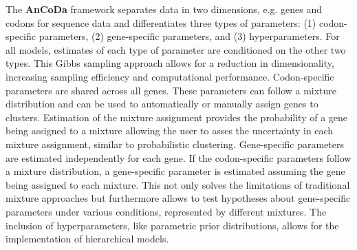 \documentclass{bioinfo}
\newcommand{\package}{\textbf{AnCoDa }} %
\begin{document}
The \package framework separates data in two dimensions, e.g. genes and codons for sequence data and differentiates three types of parameters: (1) codon-specific parameters, (2) gene-specific parameters, and (3) hyperparameters. 
For all models, estimates of each type of parameter are conditioned on the other two types. 
This Gibbs sampling approach allows for a reduction in dimensionality, increasing sampling efficiency and computational performance.
Codon-specific parameters are shared across all genes. These parameters can follow a mixture distribution and can be used to automatically or manually assign genes to clusters.
Estimation of the mixture assignment provides the probability of a gene being assigned to a mixture allowing the user to asses the uncertainty in each mixture assignment, similar to probabilistic clustering.
Gene-specific parameters are estimated independently for each gene. If the codon-specific parameters follow a mixture distribution, a gene-specific parameter is estimated assuming the gene being assigned to each mixture. This not only solves the limitations of traditional mixture approaches but furthermore allows to test hypotheses about gene-specific parameters under various conditions, represented by different mixtures.
The inclusion of hyperparameters, like parametric prior distributions, allows for the implementation of hierarchical models.
\end{document}
